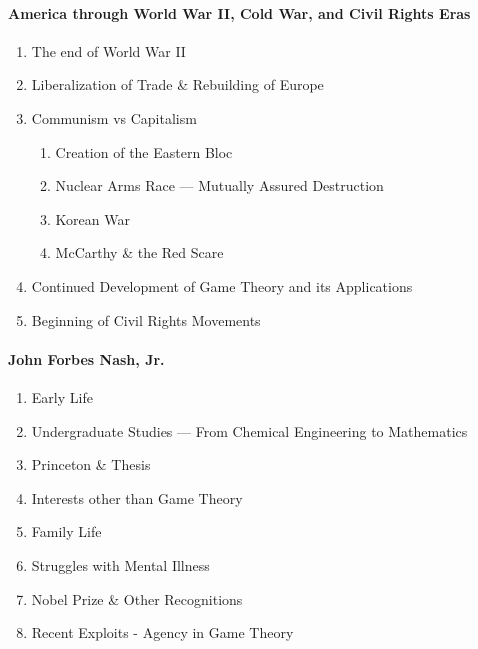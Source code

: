 \documentclass[11pt]{article}
\begin{document}
\paragraph{America through World War II, Cold War, and Civil Rights Eras}
\begin{enumerate}
	\item The end of World War II
	\item Liberalization of Trade \& Rebuilding of Europe
	\item Communism vs Capitalism
	\begin{enumerate}
		\item Creation of the Eastern Bloc
		\item Nuclear Arms Race --- Mutually Assured Destruction
		\item Korean War
		\item McCarthy \& the Red Scare
	\end{enumerate}
	\item Continued Development of Game Theory and its Applications
	\item Beginning of Civil Rights Movements
\end{enumerate}

\paragraph{John Forbes Nash, Jr.}
\begin{enumerate}
	\item Early Life
	\item Undergraduate Studies ---  From Chemical Engineering to Mathematics
	\item Princeton \& Thesis
	\item Interests other than Game Theory
	\item Family Life
	\item Struggles with Mental Illness
	\item Nobel Prize \& Other Recognitions
	\item Recent Exploits - Agency in Game Theory
\end{enumerate}

\newpage
\end{document}
